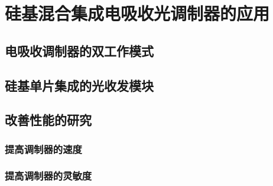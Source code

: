 %
%
\chapter{硅基混合集成电吸收光调制器的应用}
\section{电吸收调制器的双工作模式}
\section{硅基单片集成的光收发模块}
\section{改善性能的研究}
\subsection{提高调制器的速度}
\subsection{提高调制器的灵敏度}
